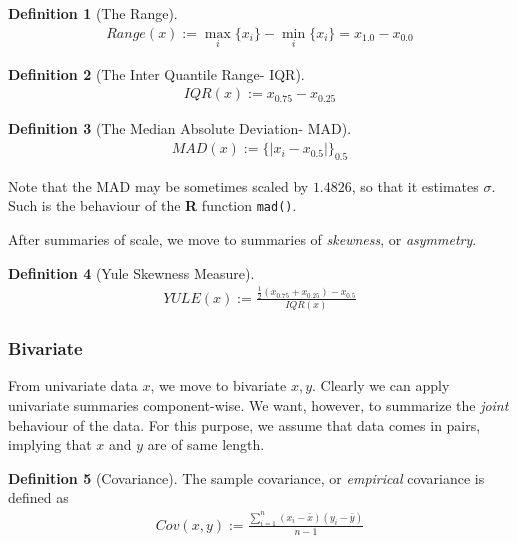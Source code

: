 \documentclass[12pt,a4paper]{report}
\theoremstyle{plain}
\theoremstyle{definition}
\newtheorem{definition}{Definition}
\newcommand{\set}[1]{\{ #1 \}} \newcommand{\setII}[1]{\left\{ #1 \right\}} \newcommand{\rv}[1]{\mathbf{#1}} \newcommand{\x}{\rv x} \newcommand{\y}{\rv y} \newcommand{\U}{\rv u} \newcommand{\T}{\rv t} \newcommand{\X}{\rv X} \newcommand{\Y}{\rv Y} \newcommand{\expect}[1]{\mathbf{E}\left[ #1 \right]} \newcommand{\expectg}[2]{\mathbf{E}_{\rv{#1}}\left[ \rv{#2} \right]} \newcommand{\expectn}[1]{\mathbb{E}\left[#1\right]} \newcommand{\cov}[1]{\mathbf{Cov} \left[ #1 \right]} \newcommand{\var}[1]{\mathop{Var} \left[ #1 \right]} \newcommand{\covn}[1]{\mathbb{Cov} \left[ #1 \right]} \newcommand{\gauss}[1]{\mathcal{N}\left(#1\right)} \newcommand{\cdf}[2]{F_{#1} (#2)} \newcommand{\survive}[2]{S_{#1} (#2)} \newcommand{\hazard}[2]{h_{#1} (#2)} \newcommand{\cuhazard}[2]{H_{#1} (#2)} \newcommand{\cdfn}[2]{\mathbb{F}_{#1}(#2)} \newcommand{\icdf}[2]{F_\rv{#1}^{-1} (#2)} \newcommand{\icdfn}[2]{\mathbb{F}^{-1}_{#1}(#2)} \newcommand{\pdf}[2]{p_{#1} (#2)} \newcommand{\prob}[1]{P\left( #1 \right)} \newcommand{\dist}{P} \newcommand{\density}{p}
\newcommand{\R}{\textnormal{\sffamily\bfseries R }}
\newcommand{\rcode}[1]{\texttt{#1}}
\begin{document}
\begin{definition}[The Range]
\begin{align}
	Range(x):= \max_i\set{x_i}-\min_i\set{x_i}= x_{1.0}-x_{0.0}
\end{align}
\end{definition}

\begin{definition}[The Inter Quantile Range- IQR]
\label{def:iqr}
\begin{align}
	IQR(x):= x_{0.75}-x_{0.25}
\end{align}
\end{definition}



\begin{definition}[The Median Absolute Deviation- MAD]
\label{def:mad}
\begin{align}
	MAD(x):= \set{|x_i-x_{0.5}|}_{0.5} 
\end{align}
\end{definition}
Note that the MAD may be sometimes scaled by $1.4826$, so that it estimates $\sigma$. Such is the behaviour of the \R function \rcode{mad()}. 


After summaries of scale, we move to summaries of \emph{skewness}, or \emph{asymmetry}.

\begin{definition}[Yule Skewness Measure]
\begin{align}
	YULE(x):= \frac{\frac{1}{2} (x_{0.75}+x_{0.25})-x_{0.5}}{IQR(x)}
\end{align}
\end{definition}

 


\subsubsection{Bivariate}
From univariate data $x$, we move to bivariate $x,y$.
Clearly we can apply univariate summaries component-wise. 
We want, however, to summarize the \emph{joint} behaviour of the data. 
For this purpose, we assume that data comes in pairs, implying that $x$ and $y$ are of same length.


\begin{definition}[Covariance]
The sample covariance, or \emph{empirical} covariance is defined as
\begin{align}
	Cov(x,y):= \frac{\sum_{i=1}^{n} (x_i-\bar{x})(y_i-\bar{y})}{n-1}
\end{align}
\end{definition}
\end{document}
